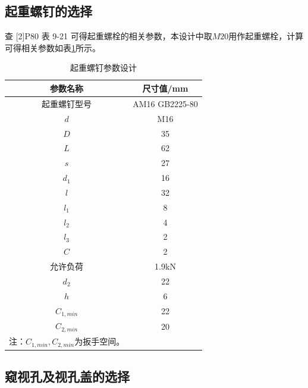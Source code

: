 \documentclass[12pt]{ctexart}
\begin{document}
\subsection{起重螺钉的选择}

查 [2]P80 表 9-21 可得起重螺栓的相关参数，本设计中取$M20$用作起重螺栓，计算可得相关参数如表\ref{table18}所示。
\begin{table}[htbp]
    \centering
    \setlength{\belowcaptionskip}{0.3cm}
    \caption{起重螺钉参数设计}

    \begin{tabular}{c c}
        \toprule
        参数名称    & 尺寸值/mm \\
        \midrule
        起重螺钉型号 &  AM16 GB2225-80\\
        $d$         &  M16\\
        $D$         &  35 \\
        $L$         &  62 \\
        $s$         &  27 \\
        $d_1$       &  16\\
        $l$         &  32 \\
        $l_1$       &  8  \\
        $l_2$       &  4  \\
        $l_3$       &  2  \\
        $C$         &  2 \\
        允许负荷     &  1.9kN \\
        $d_2$       &  22 \\
        $h$         &  6   \\
        $C_{1,min}$ &  22 \\
        $C_{2,min}$ &  20 \\
        \bottomrule
        注：$C_{1,min},C_{2,min}$为扳手空间。 &\\
    \end{tabular}
    
    \label{table18}
\end{table}

\subsection{窥视孔及视孔盖的选择}
\end{document}
